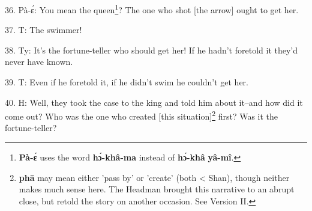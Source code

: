 36. Pà-ɛ́: You mean the queen\footnote{\textbf{Pà-ɛ́} uses the word \textbf{hɔ́-khâ-ma} instead of \textbf{hɔ́-khâ} \textbf{yâ-mî}.}? The one who shot [the arrow] ought to get
her.

37. T: The swimmer!

38. Ty: It's the fortune-teller who should get her! If he hadn't foretold it they'd
never have known.

39. T: Even if he foretold it, if he didn't swim he couldn't get her.

40. H: Well, they took the case to the king and told him about it--and how did it
come out? Who was the one who created [this situation]\footnote{\textbf{phā} may mean either 'pass by' or 'create' (both < Shan), though neither makes much sense here. The Headman brought this narrative to an abrupt close, but retold the story on another occasion. See Version II.} first? Was it the fortune-teller?


